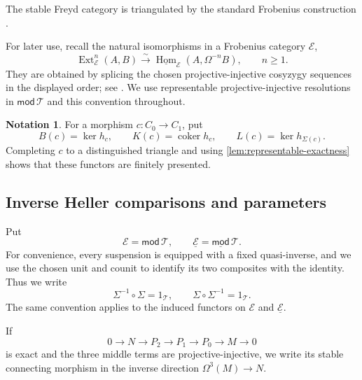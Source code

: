 \documentclass[a4paper,11pt,reqno]{amsart}
\theoremstyle{definition}
\newtheorem{notation}[notation]{Notation}
\theoremstyle{plain}
\numberwithin{equation}{section}
\newcommand{\T}{\mathcal T}
\newcommand{\coker}{\operatorname{coker}}
\newcommand{\Hom}{\operatorname{Hom}}
\newcommand{\Ext}{\operatorname{Ext}}
\begin{document}
The stable Freyd category is triangulated by the standard Frobenius
construction \cite[Chapter~I, Section~2]{Happel1988}.

For later use, recall the natural isomorphisms in a Frobenius category
$\mathcal E$,
\begin{equation}
\label{eq:stable-dimension-shift}
 \Ext^n_{\mathcal E}(A,B)
 \xrightarrow{\sim}
 \underline{\Hom}_{\mathcal E}(A,\Omega^{-n}B),
 \qquad n\geq1.
\end{equation}
They are obtained by splicing the chosen projective-injective cosyzygy
sequences in the displayed order; see
\cite[Chapter~I, Section~2]{Happel1988}.  We use representable
projective-injective resolutions in $\mathsf{mod}\,\T$ and this convention
throughout.

\begin{notation}
\label{not:characteristic-functors}
For a morphism $c:C_0\to C_1$, put
\[
 B(c)=\ker h_c,\qquad
 K(c)=\coker h_c,\qquad
 L(c)=\ker h_{\Sigma(c)}.
\]
Completing $c$ to a distinguished triangle and using
\cref{lem:representable-exactness} shows that these functors are finitely
presented.
\end{notation}

\subsection{Inverse Heller comparisons and parameters}

Put
\[
 \mathcal E=\mathsf{mod}\,\T,
 \qquad
 \underline{\mathcal E}=\underline{\mathsf{mod}}\,\T.
\]
For convenience, every suspension is equipped with a fixed quasi-inverse,
and we use the chosen unit and counit to identify its two composites with
the identity.  Thus we write
\[
 \Sigma^{-1}\circ\Sigma=1_{\T},
 \qquad
 \Sigma\circ\Sigma^{-1}=1_{\T}.
\]
The same convention applies to the induced functors on $\mathcal E$ and
$\underline{\mathcal E}$.

If
\[
0\longrightarrow N\longrightarrow P_2\longrightarrow P_1
 \longrightarrow P_0\longrightarrow M\longrightarrow0
\]
is exact and the three middle terms are projective-injective, we write its
stable connecting morphism in the inverse direction
$\Omega^3(M)\to N$.
\end{document}
